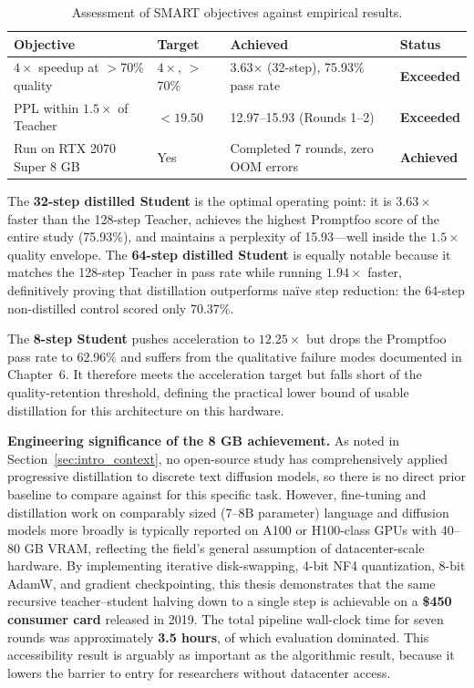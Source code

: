 \documentclass[11pt, a4paper]{article}
\begin{document}
\begin{table}[H]
\centering
\caption{Assessment of SMART objectives against empirical results.}
\label{tab:objective_achievement}
\begin{tabular}{@{}p{5.5cm}p{3cm}p{4.5cm}l@{}}
\toprule
\textbf{Objective} & \textbf{Target} & \textbf{Achieved} & \textbf{Status} \\ \midrule
$4\times$ speedup at $>$70\% quality & $4\times$, $>$70\% & 3.63$\times$ (32-step), 75.93\% pass rate & \textbf{Exceeded} \\
PPL within $1.5\times$ of Teacher & $< 19.50$ & 12.97--15.93 (Rounds 1--2) & \textbf{Exceeded} \\
Run on RTX 2070 Super 8 GB & Yes & Completed 7 rounds, zero OOM errors & \textbf{Achieved} \\ \bottomrule
\end{tabular}
\end{table}

The \textbf{32-step distilled Student} is the optimal operating point: it is $3.63\times$ faster than the 128-step Teacher, achieves the highest Promptfoo score of the entire study (75.93\%), and maintains a perplexity of 15.93---well inside the $1.5\times$ quality envelope. The \textbf{64-step distilled Student} is equally notable because it matches the 128-step Teacher in pass rate while running $1.94\times$ faster, definitively proving that distillation outperforms na\"{i}ve step reduction: the 64-step non-distilled control scored only 70.37\%.

The \textbf{8-step Student} pushes acceleration to $12.25\times$ but drops the Promptfoo pass rate to 62.96\% and suffers from the qualitative failure modes documented in Chapter~6. It therefore meets the acceleration target but falls short of the quality-retention threshold, defining the practical lower bound of usable distillation for this architecture on this hardware.

\textbf{Engineering significance of the 8 GB achievement.} As noted in Section~\ref{sec:intro_context}, no open-source study has comprehensively applied progressive distillation to discrete text diffusion models, so there is no direct prior baseline to compare against for this specific task. However, fine-tuning and distillation work on comparably sized (7--8B parameter) language and diffusion models more broadly is typically reported on A100 or H100-class GPUs with 40--80 GB VRAM, reflecting the field's general assumption of datacenter-scale hardware. By implementing iterative disk-swapping, 4-bit NF4 quantization, 8-bit AdamW, and gradient checkpointing, this thesis demonstrates that the same recursive teacher--student halving down to a single step is achievable on a \textbf{\$450 consumer card} released in 2019. The total pipeline wall-clock time for seven rounds was approximately \textbf{3.5 hours}, of which evaluation dominated. This accessibility result is arguably as important as the algorithmic result, because it lowers the barrier to entry for researchers without datacenter access.
\end{document}
